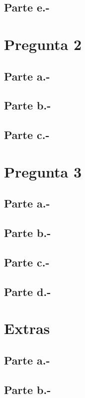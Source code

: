 \subsection{Parte e.-}



\section{Pregunta 2}

\subsection{Parte a.-}



\subsection{Parte b.-}



\subsection{Parte c.-}



\section{Pregunta 3}

\subsection{Parte a.-}



\subsection{Parte b.-}



\subsection{Parte c.-}



\subsection{Parte d.-}



\section{Extras}

\subsection{Parte a.-}



\subsection{Parte b.-}



